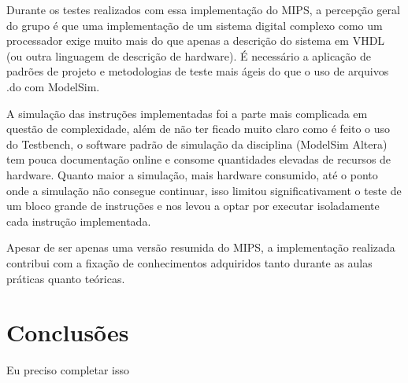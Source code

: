 \documentclass{article}
\begin{document}
    Durante os testes realizados com essa implementação do MIPS, a percepção geral do grupo é que 
    uma implementação de um sistema digital complexo como um processador exige muito mais do que apenas
    a descrição do sistema em VHDL (ou outra linguagem de descrição de hardware). É necessário a aplicação
    de padrões de projeto e metodologias de teste mais ágeis do que o uso de arquivos .do com ModelSim.

    A simulação das instruções implementadas foi a parte mais complicada em questão de complexidade, além
    de não ter ficado muito claro como é feito o uso do Testbench, o software padrão de simulação da
    disciplina (ModelSim Altera) tem pouca documentação online e consome quantidades elevadas de recursos
    de hardware. Quanto maior a simulação, mais hardware consumido, até o ponto onde a simulação não consegue
    continuar, isso limitou significativament o teste de um bloco grande de instruções e nos levou a optar
    por executar isoladamente cada instrução implementada.

    Apesar de ser apenas uma versão resumida do MIPS, a implementação realizada contribui com a fixação
    de conhecimentos adquiridos tanto durante as aulas práticas quanto teóricas.

    \section{Conclusões}

    Eu preciso completar isso
\end{document}
